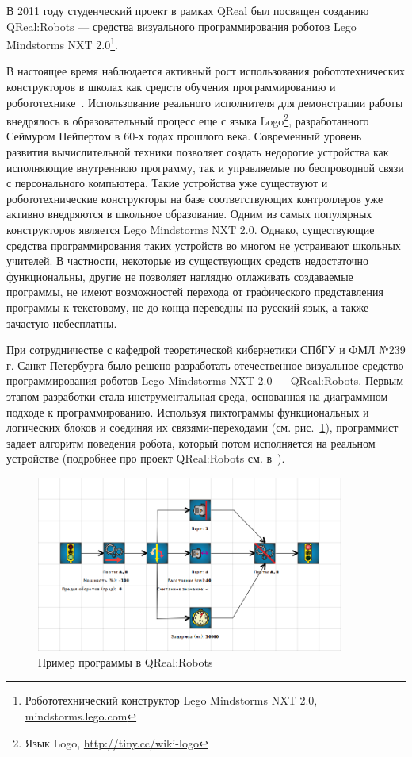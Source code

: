 \documentclass[a4paper]{article}
\begin{document}
В 2011 году студенческий проект в рамках QReal был посвящен созданию QReal:Robots --- средства визуального программирования роботов Lego Mindstorms NXT 2.0\footnote{Робототехнический конструктор Lego Mindstorms NXT 2.0, \url{mindstorms.lego.com}}. 

В настоящее время наблюдается активный рост использования робототехнических конструкторов в школах как средств обучения программированию и робототехнике~\cite{filippov}.  Использование реального исполнителя для демонстрации работы внедрялось в образовательный процесс еще с языка Logo\footnote{Язык Logo, \url{http://tiny.cc/wiki-logo}}, разработанного Сеймуром Пейпертом в 60-х годах прошлого века. Современный уровень развития вычислительной техники позволяет создать недорогие устройства как исполняющие внутреннюю программу, так и управляемые по беспроводной связи с персонального компьютера. Такие устройства уже существуют и робототехнические конструкторы на базе соответствующих контроллеров уже активно внедряются в школьное образование. Одним из самых популярных конструкторов является Lego Mindstorms NXT 2.0. Однако, существующие средства программирования таких устройств во многом не устраивают школьных учителей. В частности, некоторые из существующих средств недостаточно функциональны, другие не позволяет наглядно отлаживать создаваемые программы, не имеют возможностей перехода от графического представления программы к текстовому, не до конца переведны на русский язык, а также зачастую небесплатны.

При сотрудничестве с кафедрой теоретической кибернетики СПбГУ и ФМЛ №239 г. Санкт-Петербурга было решено разработать отечественное визуальное средство программирования роботов Lego Mindstorms NXT 2.0 --- QReal:Robots. Первым этапом разработки стала инструментальная среда, основанная на диаграммном подходе к программированию. Используя пиктограммы функциональных и логических блоков и соединяя их связями-переходами (см. рис.~\ref{qreal-robots}), программист задает алгоритм поведения робота, который потом исполняется на реальном устройстве (подробнее про проект QReal:Robots см. в~\cite{robots}).

\begin{figure} [ht]
  \begin{center}
    \includegraphics[width=0.9\textwidth]{02-qreal-robots.png}
    \caption{Пример программы в QReal:Robots}
    \label{qreal-robots}
  \end{center}
\end{figure}
\end{document}
